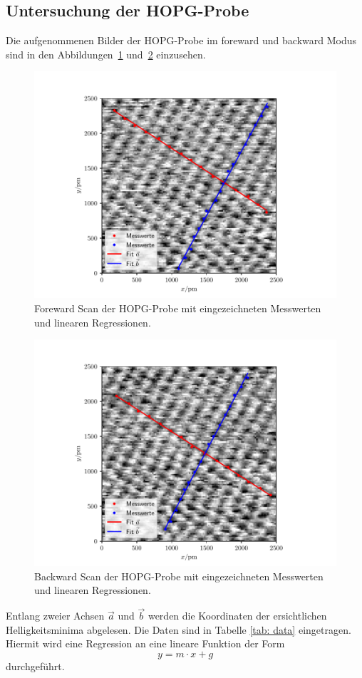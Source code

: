 \subsection{Untersuchung der HOPG-Probe}
Die aufgenommenen Bilder der HOPG-Probe im foreward und backward Modus sind in den Abbildungen~\ref{fig: foreward}
und~\ref{fig: backward} einzusehen.
\begin{figure}
  \centering
  \includegraphics[width = \textwidth]{../Messdaten/bilder/fit_01_foreward.pdf}
  \caption{Foreward Scan der HOPG-Probe mit eingezeichneten Messwerten und linearen Regressionen.}
  \label{fig: foreward}
\end{figure}
\begin{figure}
  \centering
  \includegraphics[width = \textwidth]{../Messdaten/bilder/fit_01_backward.pdf}
  \caption{Backward Scan der HOPG-Probe mit eingezeichneten Messwerten und linearen Regressionen.}
  \label{fig: backward}
\end{figure}
Entlang zweier Achsen $\vec{a}$ und $\vec{b}$ werden die Koordinaten der ersichtlichen Helligkeitsminima
abgelesen. Die Daten sind in Tabelle \ref{tab: data} eingetragen. Hiermit wird eine Regression an eine
lineare Funktion der Form
\begin{equation}
  y = m \cdot x + g
\end{equation}
durchgeführt.


